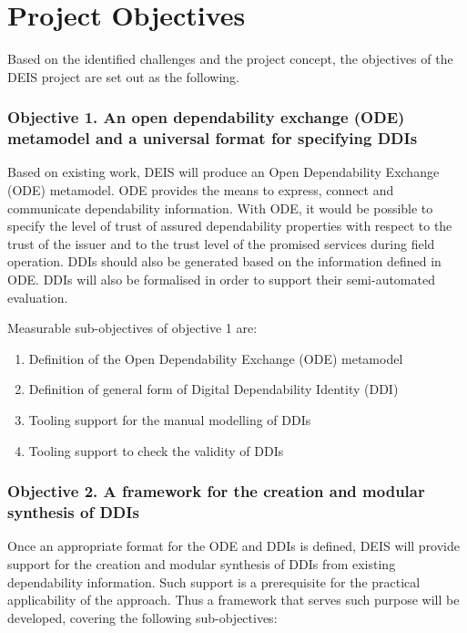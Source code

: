 \section{Project Objectives}
\label{section4}
Based on the identified challenges and the project concept, the objectives of the DEIS project are set out as the following.

\subsubsection{Objective 1. An open dependability exchange (ODE) metamodel and a universal format for specifying DDIs} 
Based on existing work, DEIS will produce an Open Dependability Exchange (ODE) metamodel. ODE provides the means to express, connect and communicate dependability information.  
With ODE, it would be possible to specify the level of trust of assured dependability properties with respect to the trust of the issuer and to the trust level of the promised services during field operation. DDIs should also be generated based on the information defined in ODE. 
DDIs will also be formalised in order to support their semi-automated evaluation.

Measurable sub-objectives of objective 1 are:
\begin{enumerate}
	\item Definition of the Open Dependability Exchange (ODE) metamodel
	\item Definition of general form of Digital Dependability Identity (DDI)
	\item Tooling support for the manual modelling of DDIs
	\item Tooling support to check the validity of DDIs
\end{enumerate}

\subsubsection{Objective 2. A framework for the creation and modular synthesis of DDIs}
Once an appropriate format for the ODE and DDIs is defined, DEIS will provide support for the creation and modular synthesis of DDIs from existing dependability information. Such support is a prerequisite for the practical applicability of the approach. Thus a framework that serves such purpose will be developed, covering the following sub-objectives:

